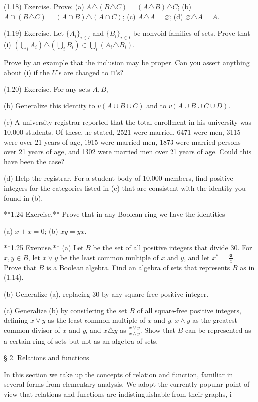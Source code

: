 (1.18) Exercise. Prove:
(a) $A \triangle (B \triangle C) = (A \triangle B) \triangle C$;
(b) $A \cap (B \triangle C) = (A \cap B) \triangle (A \cap C)$;
(c) $A \triangle A = \varnothing$;
(d) $\varnothing \triangle A = A$.

(1.19) Exercise. Let $\{A_i\}_{i \in I}$ and $\{B_i\}_{i \in I}$ be nonvoid families of sets. Prove that
(i) $(\bigcup_i A_i) \triangle (\bigcup_i B_i) \subset \bigcup_i (A_i \triangle B_i)$.

Prove by an example that the inclusion may be proper. Can you assert anything about (i) if the $U$'s are changed to $\cap$'s?

(1.20) Exercise. For any sets $A, B$,

(b) Generalize this identity to $v(A \cup B \cup C)$ and to $v(A \cup B \cup C \cup D)$.

(c) A university registrar reported that the total enrollment in his university was 10,000 students. Of these, he stated, 2521 were married, 6471 were men, 3115 were over 21 years of age, 1915 were married men, 1873 were married persons over 21 years of age, and 1302 were married men over 21 years of age. Could this have been the case?

(d) Help the registrar. For a student body of 10,000 members, find positive integers for the categories listed in (c) that are consistent with the identity you found in (b).

**1.24 Exercise.** Prove that in any Boolean ring we have the identities

(a) $x + x = 0$;
(b) $xy = yx$.

**1.25 Exercise.** (a) Let $B$ be the set of all positive integers that divide 30. For $x, y \in B$, let $x \vee y$ be the least common multiple of $x$ and $y$, and let $x^* = \frac{30}{x}$. Prove that $B$ is a Boolean algebra. Find an algebra of sets that represents $B$ as in (1.14).

(b) Generalize (a), replacing 30 by any square-free positive integer.

(c) Generalize (b) by considering the set $B$ of all square-free positive integers, defining $x \vee y$ as the least common multiple of $x$ and $y$, $x \wedge y$ as the greatest common divisor of $x$ and $y$, and $x \triangle y$ as $\frac{x \vee y}{x \wedge y}$. Show that $B$ can be represented as a certain ring of sets but not as an algebra of sets.

§ 2. Relations and functions

In this section we take up the concepts of relation and function, familiar in several forms from elementary analysis. We adopt the currently popular point of view that relations and functions are indistinguishable from their graphs, i